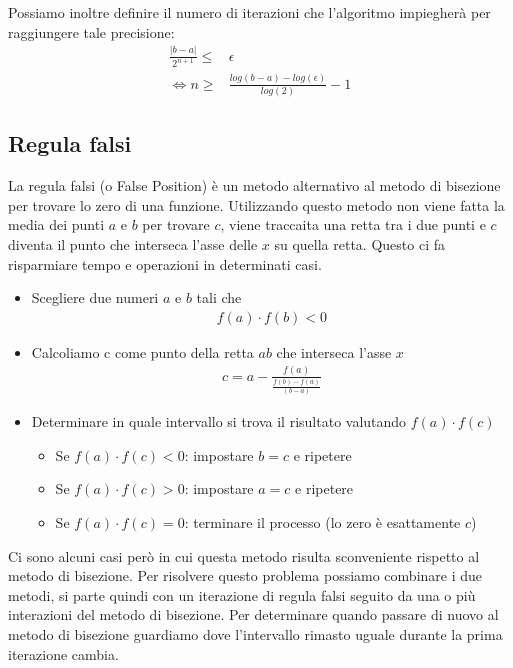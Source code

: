 \documentclass[../main.tex]{subfiles}
\begin{document}
Possiamo inoltre definire il numero di iterazioni che l'algoritmo impiegherà per raggiungere tale precisione:
\begin{align*}
    \frac{\left\lvert b - a\right\rvert }{2^{n+1}} \leq& \epsilon \\
    \Longleftrightarrow n \geq& \frac{log(b-a) - log(\epsilon)}{log(2)} - 1
\end{align*}

\pagebreak
\subsection{Regula falsi}
La regula falsi (o False Position) è un metodo alternativo al metodo di bisezione per trovare lo zero di una funzione. Utilizzando questo metodo
non viene fatta la media dei punti $a$ e $b$ per trovare $c$, viene traccaita una retta tra i due punti e $c$ diventa il punto che interseca l'asse
delle $x$ su quella retta. Questo ci fa risparmiare tempo e operazioni in determinati casi.
\vspace{0.5cm}
\begin{itemize}
    \item Scegliere due numeri $a$ e $b$ tali che \begin{align*}
        f(a) \cdot f(b) < 0
    \end{align*}
    \item Calcoliamo c come punto della retta $ab$ che interseca l'asse $x$\begin{align*}
        c = a-\frac{f(a)}{\frac{f(b)-f(a)}{(b-a)}}
    \end{align*}
    \item Determinare in quale intervallo si trova il risultato valutando $f(a) \cdot f(c)$
    \begin{itemize}
        \item Se $f(a) \cdot f(c) < 0$: impostare $b = c$ e ripetere
        \item Se $f(a) \cdot f(c) > 0$: impostare $a = c$ e ripetere
        \item Se $f(a) \cdot f(c) = 0$: terminare il processo (lo zero è esattamente $c$)
    \end{itemize}
\end{itemize}
\vspace{0.5cm}
Ci sono alcuni casi però in cui questa metodo risulta sconveniente rispetto al metodo di bisezione. Per risolvere questo problema possiamo
combinare i due metodi, si parte quindi con un iterazione di regula falsi seguito da una o più interazioni del metodo di bisezione.
Per determinare quando passare di nuovo al metodo di bisezione guardiamo dove l'intervallo rimasto uguale durante la prima iterazione cambia.
\end{document}

